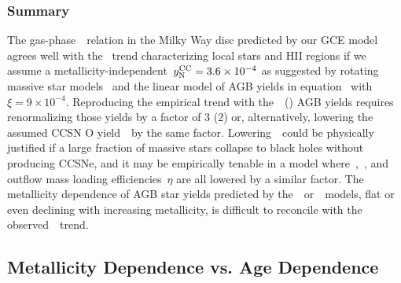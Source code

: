 \documentclass[ms.tex]{subfiles}
\begin{document}
\subsubsection{Summary}
\label{sec:results:yields:summary}
The gas-phase~\ohno~relation in the Milky Way disc predicted by our GCE model
agrees well with the~\citet{Dopita2016} trend characterizing local stars and
HII regions if we assume a metallicity-independent~$y_\text{N}^\text{CC} = 3.6\times10^{-4}$
as suggested by rotating massive star models~\citep{Limongi2018} and the linear
model of AGB yields in equation~
with~$\xi = 9\times10^{-4}$.
Reproducing the empirical trend with the~\cristallo~(\ventura) AGB yields
requires renormalizing those yields by a factor of 3 (2) or, alternatively,
lowering the assumed CCSN O yield~~by the same factor.
Lowering~~could be physically justified if a large fraction of massive
stars collapse to black holes without producing CCSNe, and it may be
empirically tenable in a model where~,~, and outflow mass
loading efficiencies~$\eta$ are all lowered by a similar factor.
The metallicity dependence of AGB star yields predicted by
the~\karakasten~or~\karakas~models, flat or even declining with increasing
metallicity, is difficult to reconcile with the observed~\ohno~trend.

\subsection{Metallicity Dependence vs. Age Dependence}
\label{sec:results:t_z_dep_comp}
\end{document}
